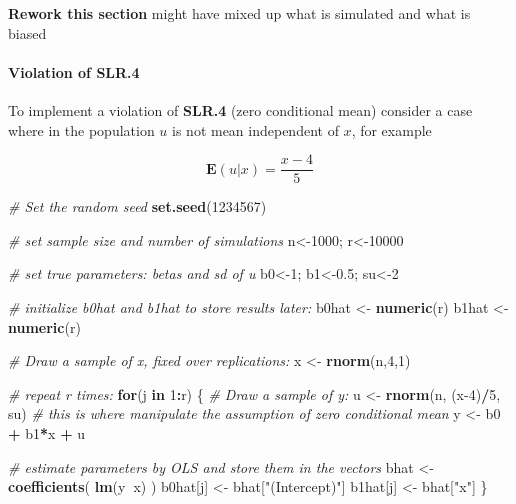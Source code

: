 \documentclass[]{book}
\newenvironment{Shaded}{\begin{snugshade}}{\end{snugshade}}
\newcommand{\CommentTok}[1]{\textcolor[rgb]{0.56,0.35,0.01}{\textit{#1}}}
\newcommand{\ControlFlowTok}[1]{\textcolor[rgb]{0.13,0.29,0.53}{\textbf{#1}}}
\newcommand{\DecValTok}[1]{\textcolor[rgb]{0.00,0.00,0.81}{#1}}
\newcommand{\FloatTok}[1]{\textcolor[rgb]{0.00,0.00,0.81}{#1}}
\newcommand{\KeywordTok}[1]{\textcolor[rgb]{0.13,0.29,0.53}{\textbf{#1}}}
\newcommand{\NormalTok}[1]{#1}
\newcommand{\OperatorTok}[1]{\textcolor[rgb]{0.81,0.36,0.00}{\textbf{#1}}}
\newcommand{\StringTok}[1]{\textcolor[rgb]{0.31,0.60,0.02}{#1}}
\let\oldparagraph\paragraph
\renewcommand{\paragraph}[1]{\oldparagraph{#1}\mbox{}}
\begin{document}
\textbf{Rework this section} might have mixed up what is simulated and
what is biased

\hypertarget{violation-of-slr.4}{%
\paragraph{Violation of SLR.4}\label{violation-of-slr.4}}

To implement a violation of \textbf{SLR.4} (zero conditional mean)
consider a case where in the population \(u\) is not mean independent of
\(x\), for example

\[
\mathbf{E}(u|x) = \frac{x-4}{5}
\]

\begin{Shaded}
\begin{Highlighting}[]
\CommentTok{# Set the random seed}
\KeywordTok{set.seed}\NormalTok{(}\DecValTok{1234567}\NormalTok{)}

\CommentTok{# set sample size and number of simulations}
\NormalTok{n<-}\DecValTok{1000}\NormalTok{; r<-}\DecValTok{10000}

\CommentTok{# set true parameters: betas and sd of u}
\NormalTok{b0<-}\DecValTok{1}\NormalTok{; b1<-}\FloatTok{0.5}\NormalTok{; su<-}\DecValTok{2}

\CommentTok{# initialize b0hat and b1hat to store results later:}
\NormalTok{b0hat <-}\StringTok{ }\KeywordTok{numeric}\NormalTok{(r)}
\NormalTok{b1hat <-}\StringTok{ }\KeywordTok{numeric}\NormalTok{(r)}

\CommentTok{# Draw a sample of x, fixed over replications:}
\NormalTok{x <-}\StringTok{ }\KeywordTok{rnorm}\NormalTok{(n,}\DecValTok{4}\NormalTok{,}\DecValTok{1}\NormalTok{)}

\CommentTok{# repeat r times:}
\ControlFlowTok{for}\NormalTok{(j }\ControlFlowTok{in} \DecValTok{1}\OperatorTok{:}\NormalTok{r) \{}
  \CommentTok{# Draw a sample of y:}
\NormalTok{  u <-}\StringTok{ }\KeywordTok{rnorm}\NormalTok{(n, (x}\DecValTok{-4}\NormalTok{)}\OperatorTok{/}\DecValTok{5}\NormalTok{, su) }\CommentTok{# this is where manipulate the assumption of zero conditional mean}
\NormalTok{  y <-}\StringTok{ }\NormalTok{b0 }\OperatorTok{+}\StringTok{ }\NormalTok{b1}\OperatorTok{*}\NormalTok{x }\OperatorTok{+}\StringTok{ }\NormalTok{u}
  
  \CommentTok{# estimate parameters by OLS and store them in the vectors}
\NormalTok{  bhat <-}\StringTok{ }\KeywordTok{coefficients}\NormalTok{( }\KeywordTok{lm}\NormalTok{(y}\OperatorTok{~}\NormalTok{x) )}
\NormalTok{  b0hat[j] <-}\StringTok{ }\NormalTok{bhat[}\StringTok{"(Intercept)"}\NormalTok{]}
\NormalTok{  b1hat[j] <-}\StringTok{ }\NormalTok{bhat[}\StringTok{"x"}\NormalTok{]}
\NormalTok{\}}
\end{Highlighting}
\end{Shaded}
\end{document}

